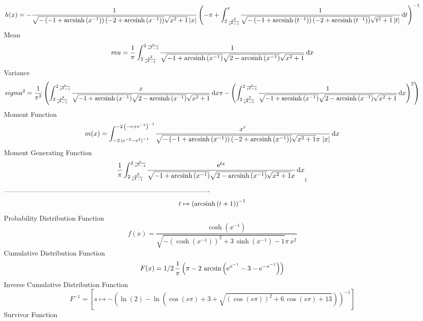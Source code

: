 \documentclass[12pt]{article}
\begin{document}
 $$ h(x)=-{\frac {1}{\sqrt {- \left( -1+{\rm arcsinh} \left({x}^{-1}\right)
 \right)  \left( -2+{\rm arcsinh} \left({x}^{-1}\right) \right) }
\sqrt {{x}^{2}+1} \left| x \right| } \left( -\pi+\int_{2\,{\frac {{
{\rm e}^{2}}}{{{\rm e}^{4}}-1}}}^{x}\!{\frac {1}{\sqrt {- \left( -1+
{\rm arcsinh} \left({t}^{-1}\right) \right)  \left( -2+{\rm arcsinh} 
\left({t}^{-1}\right) \right) }\sqrt {{t}^{2}+1} \left| t \right| }}
\,{\rm d}t \right) ^{-1}}
$$ Mean 
 $$ mu={\frac {1}{\pi}\int_{2\,{\frac {{{\rm e}^{2}}}{{{\rm e}^{4}}-1}}}^{2\,
{\frac {{\rm e}}{{{\rm e}^{2}}-1}}}\!{\frac {1}{\sqrt {-1+
{\rm arcsinh} \left({x}^{-1}\right)}\sqrt {2-{\rm arcsinh} \left({x}^{
-1}\right)}\sqrt {{x}^{2}+1}}}\,{\rm d}x}
$$ Variance 
 $$ sigma^2 = {\frac {1}{{\pi}^{2}} \left( \int_{2\,{\frac {{{\rm e}^{2}}}{{{\rm e}^
{4}}-1}}}^{2\,{\frac {{\rm e}}{{{\rm e}^{2}}-1}}}\!{\frac {x}{\sqrt {-
1+{\rm arcsinh} \left({x}^{-1}\right)}\sqrt {2-{\rm arcsinh} \left({x}
^{-1}\right)}\sqrt {{x}^{2}+1}}}\,{\rm d}x\pi- \left( \int_{2\,{\frac 
{{{\rm e}^{2}}}{{{\rm e}^{4}}-1}}}^{2\,{\frac {{\rm e}}{{{\rm e}^{2}}-
1}}}\!{\frac {1}{\sqrt {-1+{\rm arcsinh} \left({x}^{-1}\right)}\sqrt {
2-{\rm arcsinh} \left({x}^{-1}\right)}\sqrt {{x}^{2}+1}}}\,{\rm d}x
 \right) ^{2} \right) }
$$ Moment Function 
 $$ m(x) = \int_{-2\, \left( {{\rm e}^{-2}}-{{\rm e}^{2}} \right) ^{-1}}^{-2\,
 \left( -{\rm e}+{{\rm e}^{-1}} \right) ^{-1}}\!{\frac {{x}^{r}}{
\sqrt {- \left( -1+{\rm arcsinh} \left({x}^{-1}\right) \right) 
 \left( -2+{\rm arcsinh} \left({x}^{-1}\right) \right) }\sqrt {{x}^{2}
+1}\pi\, \left| x \right| }}\,{\rm d}x
$$ Moment Generating Function 
 $${\frac {1}{\pi}\int_{2\,{\frac {{{\rm e}^{2}}}{{{\rm e}^{4}}-1}}}^{2\,
{\frac {{\rm e}}{{{\rm e}^{2}}-1}}}\!{\frac {{{\rm e}^{tx}}}{\sqrt {-1
+{\rm arcsinh} \left({x}^{-1}\right)}\sqrt {2-{\rm arcsinh} \left({x}^
{-1}\right)}\sqrt {{x}^{2}+1}x}}\,{\rm d}x}_{{1}}
$$-------------------------------------------------------------------------------------------  \\$$t\mapsto  \left( {\rm arcsinh} \left(t+1\right) \right) ^{-1}
$$Probability Distribution Function 
$$  f(x)={\frac {\cosh \left( {x}^{-1} \right) }{\sqrt {- \left( \cosh \left( {
x}^{-1} \right)  \right) ^{2}+3\,\sinh \left( {x}^{-1} \right) -1}\pi
\,{x}^{2}}}
$$Cumulative Distribution Function  
 $$F(x)=1/2\,{\frac {1}{\pi} \left( \pi-2\,\arcsin \left( {{\rm e}^{{x}^{-1}}}
-3-{{\rm e}^{-{x}^{-1}}} \right)  \right) }
$$ Inverse Cumulative Distribution Function 
  $$F^{-1} = [s\mapsto - \left( \ln  \left( 2 \right) -\ln  \left( \cos \left( s\pi
 \right) +3+\sqrt { \left( \cos \left( s\pi \right)  \right) ^{2}+6\,
\cos \left( s\pi \right) +13} \right)  \right) ^{-1}]
$$Survivor Function 
\end{document}
